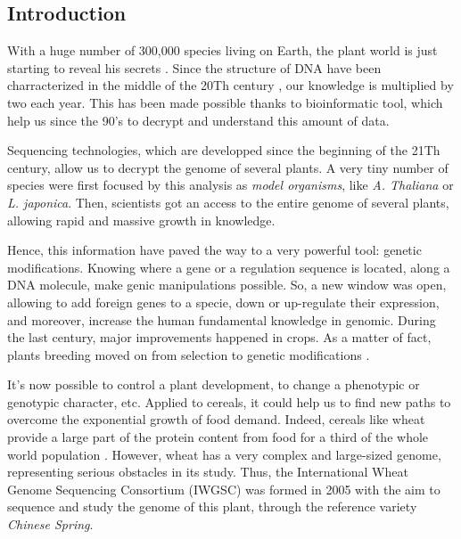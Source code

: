 \documentclass[a4paper, 12pt]{article}
\begin{document}
\begin{onehalfspace}
\newpage
\pagestyle{plain}
\setcounter{page}{1}

\part{Introduction}

With a huge number of 300,000 species living on Earth, the plant world is just starting to reveal his secrets \citep{mora2011}. Since the structure of DNA have been charracterized in the middle of the 20Th century \citep{watson1953}, our knowledge is multiplied by two each year. This has been made possible thanks to bioinformatic tool, which help us since the 90's to decrypt and understand this amount of data. 

Sequencing technologies, which are developped since the beginning of the 21Th century, allow us to decrypt the genome of several plants. A very tiny number of species were first focused by this analysis as \textit{model organisms}, like \textit{A. Thaliana} or \textit{L. japonica}. Then, scientists got an access to the entire genome of several plants, allowing rapid and massive growth in knowledge.

Hence, this information have paved the way to a very powerful tool: genetic modifications. Knowing where a gene or a regulation sequence is located, along a DNA molecule, make genic manipulations possible. So, a new window was open, allowing to add foreign genes to a specie, down or up-regulate their expression, and moreover, increase the human fundamental knowledge in genomic. During the last century, major improvements happened in crops. As a matter of fact, plants breeding moved on from selection to genetic modifications \citep{Halford2006}.

It's now possible to control a plant development, to change a phenotypic or genotypic character, etc. Applied to cereals, it could help us to find new paths to overcome the exponential growth of food demand. Indeed, cereals like wheat provide a large part of the protein content from food for a third of the whole world population \citep{Hawkesford2013}. However, wheat has a very complex and large-sized genome, representing serious obstacles in its study. Thus, the International Wheat Genome Sequencing Consortium (IWGSC) was formed in 2005 with the aim to sequence and study the genome of this plant, through the reference variety \textit{Chinese Spring}.


\end{onehalfspace}
\end{document}
